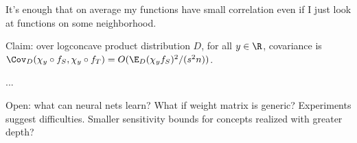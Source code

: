 
It's enough that on average my functions have small correlation even if I just look at functions on some neighborhood. 

Claim: over logconcave product distribution $D$, for all $y\in \R$, covariance is $\Cov_D(\chi_y\circ f_S, \chi_y\circ f_T) = O(\E_D(\chi_yf_S)^2/(s^2n))$. 

...

Open: what can neural nets learn? What if weight matrix is generic? Experiments suggest difficulties. Smaller sensitivity bounds for concepts realized with greater depth?